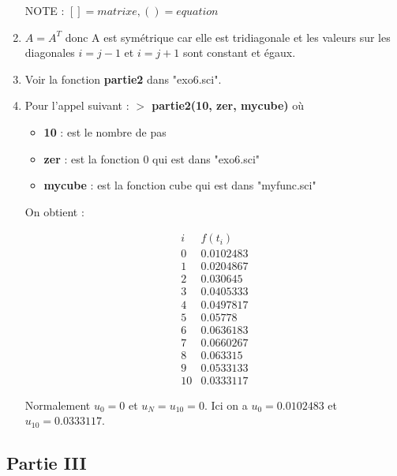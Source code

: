 \documentclass[12pt, letterpaper]{article}
\begin{document}
\begin{enumerate}
    NOTE : $[] = matrixe, () = equation$


  \item
    $A = A^T$ donc A est symétrique car elle est tridiagonale et les
    valeurs sur les diagonales $i = j - 1$ et $i = j + 1$ sont
    constant et égaux.

  \item
    Voir la fonction \textbf{partie2} dans "exo6.sci".

  \item
    Pour l'appel suivant :\newline
    \textbf{$>$ partie2(10, zer, mycube)} \newline
    où \begin{itemize}
      \item \textbf{10} : est le nombre de pas
      \item \textbf{zer} : est la fonction 0 qui est dans "exo6.sci"
      \item \textbf{mycube} : est la fonction cube qui est dans "myfunc.sci"
    \end{itemize}

    On obtient :

    \begin{equation*}
      \begin{array}{ll}
        i & f(t_i) \\
        0 & 0.0102483 \\
        1 & 0.0204867 \\
        2 & 0.030645 \\
        3 & 0.0405333 \\
        4 & 0.0497817 \\
        5 & 0.05778  \\
        6 & 0.0636183 \\
        7 & 0.0660267 \\
        8 & 0.063315 \\
        9 & 0.0533133 \\
        10 & 0.0333117
      \end{array}
    \end{equation*}

    Normalement $u_0 = 0$ et $u_N = u_{10} = 0$. \newline
    Ici on a $u_0 = 0.0102483$ et $u_{10} = 0.0333117$.
  
\end{enumerate}

\subsection*{Partie III}
\end{document}
